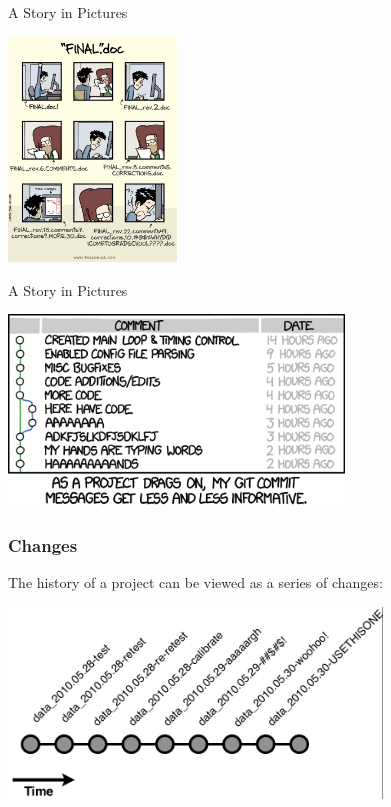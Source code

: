   \begin{frame}[t]{A Story in Pictures} 
    \begin{center}
      \includegraphics[height=2.350in]{../images/phd101212s.png} 
    \end{center} 
  \end{frame}


  \begin{frame}[t]{A Story in Pictures} 
    \begin{center}
      \includegraphics[height=2.000in]{../images/xkcd_git_commit.png} 
    \end{center} 
  \end{frame}


  \begin{frame}[t]
    \frametitle{Changes}
    The history of a project can be viewed as a series of changes:
    \begin{center}
      \includegraphics[height=2.00in]{../images/from-wickham-01.png} 
    \end{center} 
  \end{frame}

